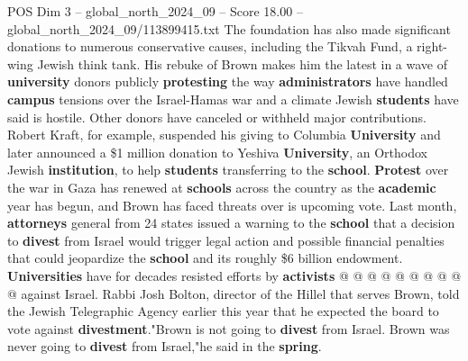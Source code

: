 \begin{textsample}{POS Dim 3 – global\_north\_2024\_09 – Score 18.00 – global\_north\_2024\_09/113899415.txt}
The foundation has also made significant donations to numerous conservative causes, including the Tikvah Fund, a right-wing Jewish think tank.
His rebuke of Brown makes him the latest in a wave of \textbf{university} donors publicly \textbf{protesting} the way \textbf{administrators} have handled \textbf{campus} tensions over the Israel-Hamas war and a climate Jewish \textbf{students} have said is hostile.
Other donors have canceled or withheld major contributions.
Robert Kraft, for example, suspended his giving to Columbia \textbf{University} and later announced a \$1 million donation to Yeshiva \textbf{University}, an Orthodox Jewish \textbf{institution}, to help \textbf{students} transferring to the \textbf{school}. \textbf{Protest} over the war in Gaza has renewed at \textbf{schools} across the country as the \textbf{academic} year has begun, and Brown has faced threats over is upcoming vote.
Last month, \textbf{attorneys} general from 24 states issued a warning to the \textbf{school} that a decision to \textbf{divest} from Israel would trigger legal action and possible financial penalties that could jeopardize the \textbf{school} and its roughly \$6 billion endowment. \textbf{Universities} have for decades resisted efforts by \textbf{activists} @ @ @ @ @ @ @ @ @ @ against Israel.
Rabbi Josh Bolton, director of the Hillel that serves Brown, told the Jewish Telegraphic Agency earlier this year that he expected the board to vote against \textbf{divestment}."Brown is not going to \textbf{divest} from Israel.
Brown was never going to \textbf{divest} from Israel,"he said in the \textbf{spring}.

\end{textsample}
